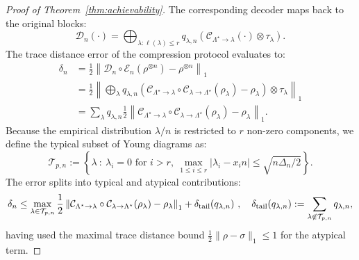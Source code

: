\documentclass[a4paper,onecolumn,11pt]{quantumarticle}
\def\map{\mathcal}
\begin{document}
\begin{proof}[Proof of Theorem~\ref{thm:achievability}]
The corresponding decoder maps back to the original blocks:
\begin{equation}
    \map{D}_n(\cdot) = \bigoplus_{\lambda : \ell(\lambda) \le r} q_{\lambda,n}\left(\map{C}_{\Lambda^\star\to \lambda}(\cdot)\otimes\tau_\lambda\right).
\end{equation}
The trace distance error of the compression protocol evaluates to:
\begin{equation}
\begin{aligned}
    \delta_n &= \frac12\left\|\map{D}_n\circ\map{E}_n(\rho^{\otimes n})-\rho^{\otimes n}\right\|_1\\
    &= \frac12\left\|\bigoplus_{\lambda}q_{\lambda,n}\left(\map{C}_{\Lambda^\star\to \lambda}\circ\map{C}_{\lambda\to \Lambda^\star}(\rho_\lambda)-\rho_\lambda\right)\otimes\tau_\lambda\right\|_1\\
    &= \sum_{\lambda}q_{\lambda,n} \frac12 \left\|\map{C}_{\Lambda^\star\to \lambda}\circ\map{C}_{\lambda\to \Lambda^\star}(\rho_\lambda)-\rho_\lambda\right\|_1.
\end{aligned}
\end{equation}
Because the empirical distribution $\lambda/n$ is restricted to $r$ non-zero components, we define the typical subset of Young diagrams as:
\begin{equation}\label{eq:typical_set}
\mathcal{T}_{p,n}:= \left\{\lambda~:~\lambda_i = 0 \text{ for } i>r, \ \max_{1 \le i \le r}|\lambda_i-x_i n|\le \sqrt{n\Delta_n/2} \right\}.
\end{equation}
The error splits into typical and atypical contributions:
\begin{equation}\label{eq:error_twoterms}
\delta_n\le \max_{\lambda\in\mathcal{T}_{p,n}} \frac12\left\|\map{C}_{\Lambda^\star\to \lambda}\circ\map{C}_{\lambda\to \Lambda^\star}(\rho_\lambda)-\rho_\lambda\right\|_1 + \delta_{\rm tail}(q_{\lambda,n}) \ , \quad \delta_{\rm tail}(q_{\lambda,n}):= \sum_{\lambda\not\in\mathcal{T}_{p,n}}q_{\lambda,n}, 
\end{equation}
having used the maximal trace distance bound $\frac12\|\rho-\sigma\|_1\le 1$ for the atypical term.


\end{proof}
\end{document}
